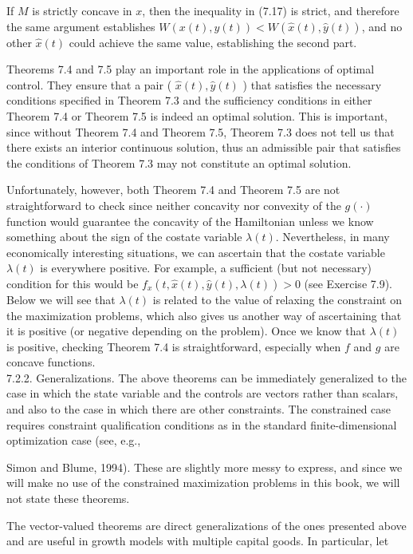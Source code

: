 \documentclass[\topdir/lecture_notes.tex]{subfiles}
\begin{document}
If $M$ is strictly concave in $x$, then the inequality in (7.17) is strict, and therefore the same argument establishes $W(x(t), y(t))<W(\hat{x}(t), \hat{y}(t))$, and no other $\hat{x}(t)$ could achieve the same value, establishing the second part.

Theorems 7.4 and 7.5 play an important role in the applications of optimal control. They ensure that a pair ( $\hat{x}(t), \hat{y}(t)$ ) that satisfies the necessary conditions specified in Theorem 7.3 and the sufficiency conditions in either Theorem 7.4 or Theorem 7.5 is indeed an optimal solution. This is important, since without Theorem 7.4 and Theorem 7.5, Theorem 7.3 does not tell us that there exists an interior continuous solution, thus an admissible pair that satisfies the conditions of Theorem 7.3 may not constitute an optimal solution.

Unfortunately, however, both Theorem 7.4 and Theorem 7.5 are not straightforward to check since neither concavity nor convexity of the $g(\cdot)$ function would guarantee the concavity of the Hamiltonian unless we know something about the sign of the costate variable $\lambda(t)$. Nevertheless, in many economically interesting situations, we can ascertain that the costate variable $\lambda(t)$ is everywhere positive. For example, a sufficient (but not necessary) condition for this would be $f_{x}(t, \hat{x}(t), \hat{y}(t), \lambda(t))>0$ (see Exercise 7.9). Below we will see that $\lambda(t)$ is related to the value of relaxing the constraint on the maximization problems, which also gives us another way of ascertaining that it is positive (or negative depending on the problem). Once we know that $\lambda(t)$ is positive, checking Theorem 7.4 is straightforward, especially when $f$ and $g$ are concave functions.\\
7.2.2. Generalizations. The above theorems can be immediately generalized to the case in which the state variable and the controls are vectors rather than scalars, and also to the case in which there are other constraints. The constrained case requires constraint qualification conditions as in the standard finite-dimensional optimization case (see, e.g.,

Simon and Blume, 1994). These are slightly more messy to express, and since we will make no use of the constrained maximization problems in this book, we will not state these theorems.

The vector-valued theorems are direct generalizations of the ones presented above and are useful in growth models with multiple capital goods. In particular, let
\end{document}
